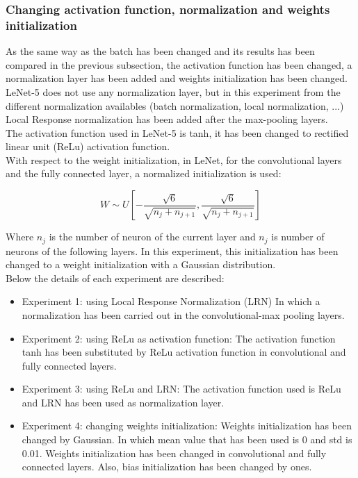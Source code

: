 \subsubsection{Changing activation function, normalization and weights initialization}
As the same way as the batch has been changed and its results has been compared in the previous subsection, the activation function has been changed, a normalization layer has been added and weights initialization has been changed.\\

LeNet-5 does not use any normalization layer, but in this experiment from the different normalization availables (batch normalization, local normalization, ...) Local Response normalization has been added after the max-pooling layers.\\

The activation function used in LeNet-5 is tanh, it has been changed to rectified linear unit (ReLu) activation function.\\

With respect to the weight initialization, in LeNet, for the convolutional layers and the fully connected layer,  a normalized initialization \cite{XavierInitialization} is used:

\begin{equation}
  W \sim U [- \frac{\sqrt{6}}{\sqrt{n_{j}+n_{j+1}}},\frac{\sqrt{6}}{\sqrt{n_{j}+n_{j+1}}}]
\end{equation}

Where $n_{j}$ is the number of neuron of the current layer and $n_{j}$ is number of neurons of the following layers. In this experiment, this initialization has been changed to a weight initialization with a Gaussian distribution.\\

Below the details of each experiment are described:\\

\begin{itemize}
\item{Experiment 1: using Local Response Normalization (LRN) In which a normalization has been carried out in the convolutional-max pooling layers.}
\item{Experiment 2: using ReLu as activation function:} The activation function tanh has been substituted by ReLu activation function in convolutional and fully connected layers.
\item{Experiment 3: using ReLu and LRN}: The activation function used is ReLu and LRN has been used as  normalization layer.
\item{Experiment 4: changing weights initialization}: Weights initialization has been changed by Gaussian. In which mean value that has been used is 0 and std is 0.01. Weights initialization has been changed in convolutional and fully connected layers. Also, bias initialization has been changed by ones.
\end{itemize}

